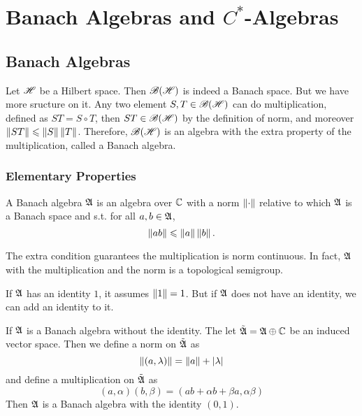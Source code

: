 \chapter{Banach Algebras and \texorpdfstring{$C^{*}$-Algebras}{C*-Algebras}}
\section{Banach Algebras}

Let $\mathscr{H}$ be a Hilbert space. Then $\mathscr{B(H)}$ is indeed a Banach space. But we have more sructure on it. Any two element $S,T \in \mathscr{B(H)}$ can do multiplication, defined as $ST = S \circ T$, then $ST \in \mathscr{B(H)}$ by the definition of norm, and moreover $\left\lVert ST\right\lVert \leqslant \left\lVert S\right\lVert\left\lVert T\right\lVert$. Therefore, $\mathscr{B(H)}$ is an algebra with the extra property of the multiplication, called a Banach algebra.

\subsection{Elementary Properties}

\begin{defn}
	A Banach algebra $\mathfrak{A}$ is an algebra over $\mathbb{C}$ with a norm $\left\lVert\cdot\right\lVert$ relative to which $\mathfrak{A}$ is a Banach space and s.t. for all $a,b \in \mathfrak{A}$,
	\begin{equation*}
		\left\lVert ab\right\lVert \leqslant \left\lVert a\right\lVert\left\lVert b\right\lVert.
	\end{equation*}
\end{defn}
\begin{rem}
	The extra condition guarantees the multiplication is norm continuous. In fact, $\mathfrak{A}$ with the multiplication and the norm is a topological semigroup.
\end{rem}

If $\mathfrak{A}$ has an identity $1$, it assumes $\left\lVert1\right\lVert=1$. But if $\mathfrak{A}$ does not have an identity, we can add an identity to it.

\begin{prop}
	If $\mathfrak{A}$ is a Banach algebra without the identity. The let $\tilde{\mathfrak{A}}= \mathfrak{A} \oplus \mathbb{C}$ be an induced vector space. Then we define a norm on $\tilde{\mathfrak{A}}$ as
	\begin{equation*}
		\left\lVert(a,\lambda)\right\lVert = \left\lVert a\right\lVert + \left\lvert\lambda\right\lvert
	\end{equation*}
	and define a multiplication on $\tilde{\mathfrak{A}}$ as
	\begin{equation*}
		(a,\alpha)(b,\beta) = (ab+\alpha b + \beta a, \alpha \beta)
	\end{equation*}
	Then $\mathfrak{A}$ is a Banach algebra with the identity $(0,1)$.
\end{prop}

